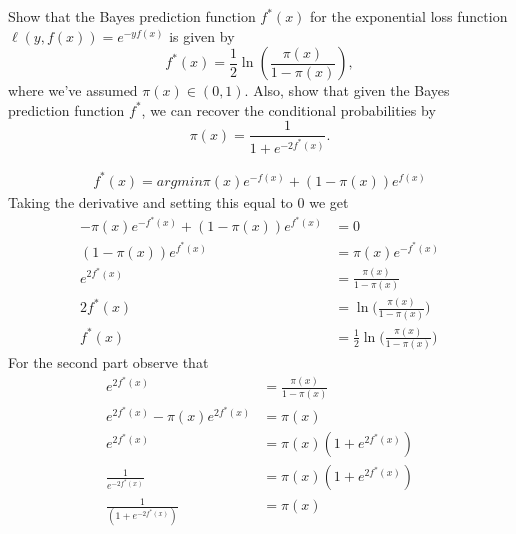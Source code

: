\documentclass[12pt,letterpaper]{article}
\begin{document}
\begin{problem}{2.2}
    Show that the Bayes prediction function $f^{*}(x)$ for the exponential
    loss function $\ell\left(y,f(x)\right)=e^{-yf(x)}$ is given by 
    \[
    f^{*}(x)=\frac{1}{2}\ln\left(\frac{\pi(x)}{1-\pi(x)}\right),
    \]
    where we've assumed $\pi(x)\in\left(0,1\right)$. Also, show that
    given the Bayes prediction function $f^{*}$, we can recover the conditional
    probabilities by
    \[
    \pi(x)=\frac{1}{1+e^{-2f^{*}(x)}}.
    \]
\end{problem}
\begin{solution}{}
    \begin{align*}
        f^*(x) = argmin \pi(x)e^{-f(x)} + (1-\pi(x))e^{f(x)}
    \end{align*}
    Taking the derivative and setting this equal to 0 we get
    \begin{align*}
        -\pi(x)e^{-f^*(x)} + (1-\pi(x))e^{f^*(x)} &= 0\\
        (1-\pi(x))e^{f^*(x)} &= \pi(x)e^{-f^*(x)}\\
        e^{2f^*(x)} &= \frac{\pi(x)}{1-\pi(x)}\\
        2f^*(x) &= \ln\bigg(\frac{\pi(x)}{1-\pi(x)}\bigg)\\
        f^*(x) &= \frac{1}{2}\ln\bigg(\frac{\pi(x)}{1-\pi(x)}\bigg)
    \end{align*}
    For the second part observe that
    \begin{align*}
         e^{2f^*(x)} &= \frac{\pi(x)}{1-\pi(x)}\\
         e^{2f^*(x)} - \pi(x)e^{2f^*(x)} &= \pi(x)\\
         e^{2f^*(x)} &= \pi(x)(1+e^{2f^*(x)})\\
         \frac{1}{e^{-2f^*(x)}} &= \pi(x)(1+e^{2f^*(x)})\\
         \frac{1}{(1+e^{-2f^*(x)})} &= \pi(x)
    \end{align*}
\end{solution}
\newpage
\end{document}
